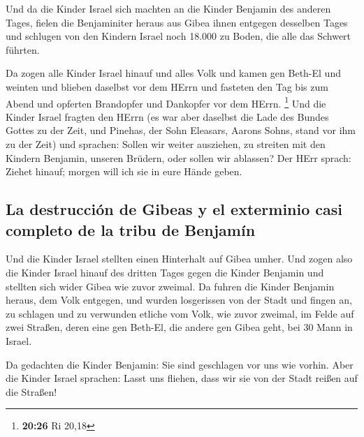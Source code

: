  Und da die Kinder Israel sich machten an die Kinder
Benjamin des anderen Tages,  fielen die Benjaminiter
heraus aus Gibea ihnen entgegen desselben Tages und schlugen von den
Kindern Israel noch 18.000 zu Boden, die alle das Schwert führten.

 Da zogen alle Kinder Israel hinauf und alles Volk und
kamen gen Beth-El und weinten und blieben daselbst vor dem HErrn und
fasteten den Tag bis zum Abend und opferten Brandopfer und Dankopfer vor
dem HErrn. \footnote{\textbf{20:26} Ri 20,18}  Und die
Kinder Israel fragten den HErrn (es war aber daselbst die Lade des
Bundes Gottes zu der Zeit,  und Pinehas, der Sohn
Eleasars, Aarons Sohns, stand vor ihm zu der Zeit) und sprachen: Sollen
wir weiter ausziehen, zu streiten mit den Kindern Benjamin, unseren
Brüdern, oder sollen wir ablassen? Der HErr sprach: Ziehet hinauf;
morgen will ich sie in eure Hände geben.

\hypertarget{la-destrucciuxf3n-de-gibeas-y-el-exterminio-casi-completo-de-la-tribu-de-benjamuxedn}{%
\subsection{La destrucción de Gibeas y el exterminio casi completo de la
tribu de
Benjamín}\label{la-destrucciuxf3n-de-gibeas-y-el-exterminio-casi-completo-de-la-tribu-de-benjamuxedn}}

 Und die Kinder Israel stellten einen Hinterhalt auf
Gibea umher.  Und zogen also die Kinder Israel hinauf des
dritten Tages gegen die Kinder Benjamin und stellten sich wider Gibea
wie zuvor zweimal.  Da fuhren die Kinder Benjamin heraus,
dem Volk entgegen, und wurden losgerissen von der Stadt und fingen an,
zu schlagen und zu verwunden etliche vom Volk, wie zuvor zweimal, im
Felde auf zwei Straßen, deren eine gen Beth-El, die andere gen Gibea
geht, bei 30 Mann in Israel.

 Da gedachten die Kinder Benjamin: Sie sind geschlagen
vor uns wie vorhin. Aber die Kinder Israel sprachen: Lasst uns fliehen,
dass wir sie von der Stadt reißen auf die Straßen!

